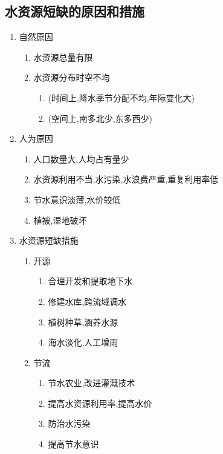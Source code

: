 \documentclass[a4paper]{article}
\begin{document}
    \subsection{水资源短缺的原因和措施}
    \begin{enumerate}
        \item 自然原因
        \begin{enumerate}
            \item 水资源总量有限
            \item 水资源分布时空不均
            \begin{enumerate}
                \item (时间上,降水季节分配不均,年际变化大)
                \item (空间上,南多北少,东多西少)
            \end{enumerate}
        \end{enumerate}
        \item 人为原因
        \begin{enumerate}
            \item 人口数量大,人均占有量少
            \item 水资源利用不当,水污染,水浪费严重,重复利用率低
            \item 节水意识淡薄,水价较低
            \item 植被,湿地破坏
        \end{enumerate}
        \item 水资源短缺措施
        \begin{enumerate}
            \item 开源
            \begin{enumerate}
                \item 合理开发和提取地下水
                \item 修建水库,跨流域调水
                \item 植树种草,涵养水源
                \item 海水淡化,人工增雨
            \end{enumerate}
            \item 节流
            \begin{enumerate}
                \item 节水农业,改进灌溉技术
                \item 提高水资源利用率,提高水价
                \item 防治水污染
                \item 提高节水意识
            \end{enumerate}
        \end{enumerate}
    \end{enumerate}
\end{document}
